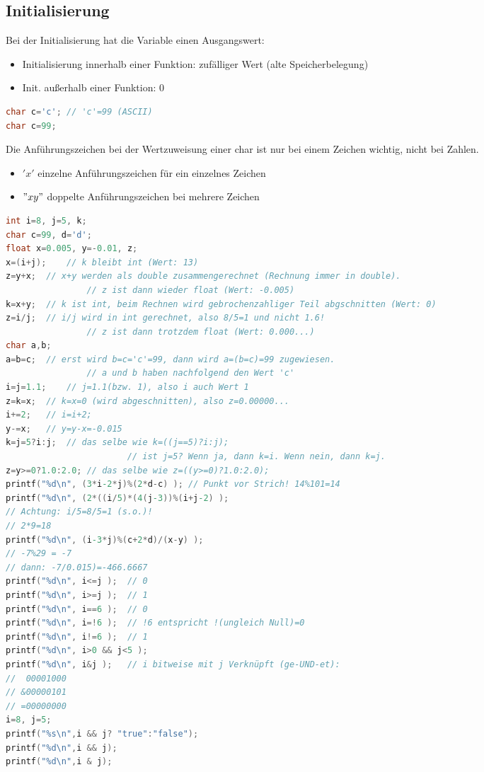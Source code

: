 \subsection{Initialisierung}
Bei der Initialisierung hat die Variable einen Ausgangswert:
\begin{itemize}
\item Initialisierung innerhalb einer Funktion: zufälliger Wert (alte Speicherbelegung)
\item Init. außerhalb einer Funktion: 0
\end{itemize}

\begin{lstlisting}[language=C]
char c='c';	// 'c'=99 (ASCII)
char c=99;
\end{lstlisting}
Die Anführungszeichen bei der Wertzuweisung einer char ist nur bei einem Zeichen wichtig, nicht bei Zahlen.
\begin{itemize}
\item $'x'$ einzelne Anführungszeichen für ein einzelnes Zeichen
\item $"xy"$ doppelte Anführungszeichen bei mehrere Zeichen
\end{itemize}

\begin{lstlisting}[language=C]
int i=8, j=5, k;
char c=99, d='d';
float x=0.005, y=-0.01, z;
x=(i+j);	// k bleibt int (Wert: 13)
z=y+x;	// x+y werden als double zusammengerechnet (Rechnung immer in double).
				// z ist dann wieder float (Wert: -0.005)
k=x+y;	// k ist int, beim Rechnen wird gebrochenzahliger Teil abgschnitten (Wert: 0)
z=i/j;	// i/j wird in int gerechnet, also 8/5=1 und nicht 1.6! 
				// z ist dann trotzdem float (Wert: 0.000...)
char a,b;
a=b=c;	// erst wird b=c='c'=99, dann wird a=(b=c)=99 zugewiesen. 
				// a und b haben nachfolgend den Wert 'c'
i=j=1.1;	// j=1.1(bzw. 1), also i auch Wert 1
z=k=x;	// k=x=0 (wird abgeschnitten), also z=0.00000...
i+=2;	// i=i+2;
y-=x;	// y=y-x=-0.015
k=j=5?i:j;	// das selbe wie k=((j==5)?i:j);
						// ist j=5? Wenn ja, dann k=i. Wenn nein, dann k=j.
z=y>=0?1.0:2.0;	// das selbe wie z=((y>=0)?1.0:2.0);
printf("%d\n", (3*i-2*j)%(2*d-c) );	// Punkt vor Strich! 14%101=14
printf("%d\n", (2*((i/5)*(4(j-3))%(i+j-2) );
// Achtung: i/5=8/5=1 (s.o.)!
// 2*9=18
printf("%d\n", (i-3*j)%(c+2*d)/(x-y) );
// -7%29 = -7
// dann: -7/0.015)=-466.6667
printf("%d\n", i<=j );	// 0
printf("%d\n", i>=j );	// 1
printf("%d\n", i==6 );	// 0
printf("%d\n", i=!6 );	// !6 entspricht !(ungleich Null)=0
printf("%d\n", i!=6 );	// 1
printf("%d\n", i>0 && j<5 );
printf("%d\n", i&j );	// i bitweise mit j Verknüpft (ge-UND-et):
//  00001000
// &00000101
// =00000000
i=8, j=5;
printf("%s\n",i && j? "true":"false");
printf("%d\n",i && j);
printf("%d\n",i & j);
\end{lstlisting}

